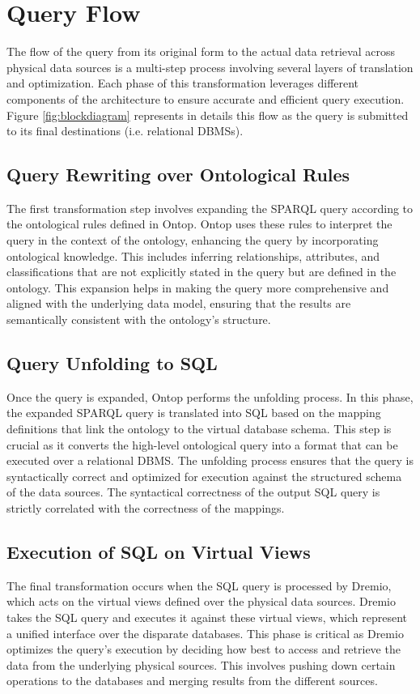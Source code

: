 \section{Query Flow}
The flow of the query from its original form to the actual data retrieval across physical data sources is a multi-step process involving several layers of translation and optimization. Each phase of this transformation leverages different components of the architecture to ensure accurate and efficient query execution. Figure \ref{fig:blockdiagram} represents in details this flow as the query is submitted to its final destinations (i.e. relational \ac{DBMS}s).
\subsection{Query Rewriting over Ontological Rules}
The first transformation step involves expanding the \ac{SPARQL} query according to the ontological rules defined in Ontop. Ontop uses these rules to interpret the query in the context of the ontology, enhancing the query by incorporating ontological knowledge. This includes inferring relationships, attributes, and classifications that are not explicitly stated in the query but are defined in the ontology. This expansion helps in making the query more comprehensive and aligned with the underlying data model, ensuring that the results are semantically consistent with the ontology's structure.
\subsection{Query Unfolding to SQL}
Once the query is expanded, Ontop performs the unfolding process. In this phase, the expanded \ac{SPARQL} query is translated into \ac{SQL} based on the mapping definitions that link the ontology to the virtual database schema. This step is crucial as it converts the high-level ontological query into a format that can be executed over a relational \ac{DBMS}. The unfolding process ensures that the query is syntactically correct and optimized for execution against the structured schema of the data sources. The syntactical correctness of the output \ac{SQL} query is strictly correlated with the correctness of the mappings.
\subsection{Execution of SQL on Virtual Views}
The final transformation occurs when the \ac{SQL} query is processed by Dremio, which acts on the virtual views defined over the physical data sources. Dremio takes the \ac{SQL} query and executes it against these virtual views, which represent a unified interface over the disparate databases. This phase is critical as Dremio optimizes the query's execution by deciding how best to access and retrieve the data from the underlying physical sources. This involves pushing down certain operations to the databases and merging results from the different sources.

